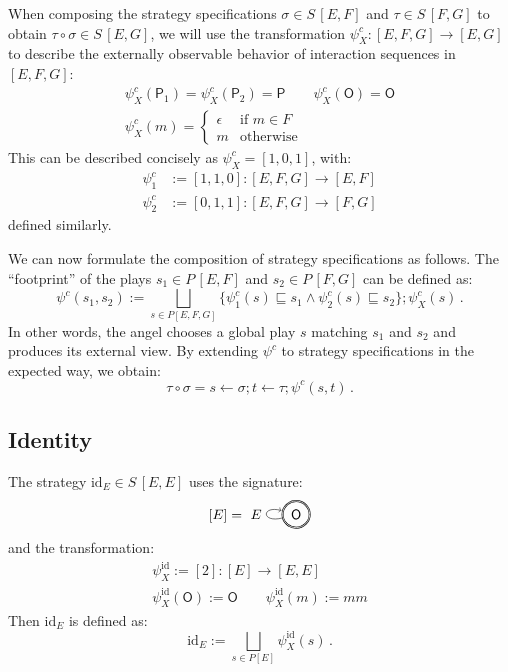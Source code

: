 \documentclass[draft,11pt]{report}
\newcommand{\kw}[1]{\ensuremath{ \mathsf{#1} }}
\begin{document}
When composing the strategy specifications
$\sigma \in S \, [E, F]$ and
$\tau \in S \, [F, G]$
to obtain $\tau \circ \sigma \in S \, [E, G]$,
we will use the transformation
$\psi^c_X : [E,F,G] \rightarrow [E,G]$
to describe the externally observable behavior
of interaction sequences in $[E,F,G]$:
\begin{gather*}
  \psi^c_X(\kw{P}_1) = \psi^c_X(\kw{P}_2) = \kw{P} \qquad
  \psi^c_X(\kw{O}) = \kw{O}
  \\
  \psi^c_X(m) = \begin{cases}
    \epsilon & \text{if } m \in F \\
    m & \text{otherwise}
  \end{cases}
\end{gather*}
This can be described concisely as
$\psi^c_X = [1,0,1]$,
with:
\begin{align*}
  \psi^c_1 &:= [1,1,0] :
    [E,F,G] \rightarrow [E,F] \\
  \psi^c_2 &:= [0,1,1] :
     [E,F,G] \rightarrow [F,G]
\end{align*}
defined similarly.

We can now formulate the composition of strategy specifications as follows.
The ``footprint'' of the plays $s_1 \in P \, [E,F]$ and $s_2 \in P \, [F,G]$
can be defined as:
\[
  \psi^c(s_1, s_2) :=
    \bigsqcup_{s \in P [E,F,G]}
    \{ \psi^c_1(s) \sqsubseteq s_1 \wedge \psi^c_2(s) \sqsubseteq s_2 \} ;
    \psi^c_X(s) \,.
\]
In other words,
the angel chooses a global play $s$
matching $s_1$ and $s_2$
and produces its external view.
By extending $\psi^c$ to strategy specifications
in the expected way, we obtain:
\[
  \tau \circ \sigma = 
    s \leftarrow \sigma ;
    t \leftarrow \tau ;
    \psi^c(s, t) \,.
\]


\subsection{Identity} %

The strategy $\mathrm{id}_E \in S \, [E,E]$
uses the signature:
\[
  [E] =
  \begin{tikzpicture}[baseline=(O.base)]
    \node[circle,draw,double] (O) at (0,0) {$\kw{O}$};
    \path[->] (O) edge[loop left] node[auto] {$E$} (O);
  \end{tikzpicture}
\]
and the transformation:
\begin{gather*}
  \psi^\mathrm{id}_X := [2] : [E] \rightarrow [E,E] \\
  \psi^\mathrm{id}_X(\kw{O}) := \kw{O} \qquad
  \psi^\mathrm{id}_X(m) := mm
\end{gather*}
Then $\mathrm{id}_E$ is defined as:
\[
  \mathrm{id}_E :=
    \bigsqcup_{s \in P [E]} \psi^\mathrm{id}_X(s) \,.
\]
\end{document}

